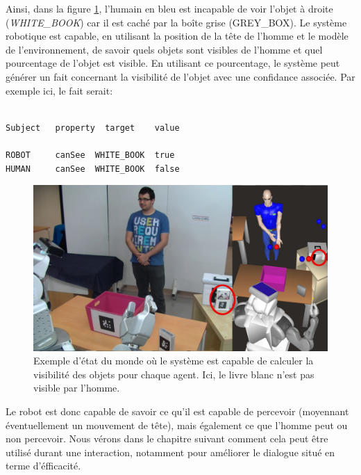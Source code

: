 \documentclass[a4paper,11pt,twoside]{StyleThese}
\begin{document}
Ainsi, dans la figure \ref{fig:occludedHuman}, l'humain en bleu est incapable de voir l'objet à droite (\textit{WHITE\_BOOK}) car il est caché par la boîte grise (GREY\_BOX). Le système robotique est capable, en utilisant la position de la tête de l'homme et le modèle de l'environnement, de savoir quels objets sont visibles de l'homme et quel pourcentage de l'objet est visible.
En utilisant ce pourcentage, le système peut générer un fait concernant la visibilité de l'objet avec une confidance associée. Par exemple ici, le fait serait:

\begin{scriptsize}
\begin{verbatim}

Subject   property  target    value

ROBOT     canSee  WHITE_BOOK  true
HUMAN     canSee  WHITE_BOOK  false
\end{verbatim}
\end{scriptsize}

\begin{figure}[ht!]
 \centering
  \includegraphics[width=0.99\linewidth]{./img/blueMovedPr2M.png} 
  \caption {Exemple d'état du monde où le système est capable de calculer la visibilité des objets pour chaque agent. Ici, le livre blanc n'est pas visible par l'homme.}
  \label{fig:occludedHuman}
\end{figure}


Le robot est donc capable de savoir ce qu'il est capable de percevoir (moyennant éventuellement un mouvement de tête), mais également ce que l'homme peut ou non percevoir. Nous vérons dans le chapitre suivant comment cela peut être utilisé durant une interaction, notamment pour améliorer le dialogue situé en terme d'éfficacité.
\end{document}

